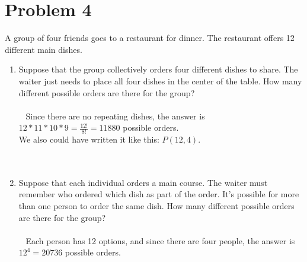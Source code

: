 \documentclass{amsart}
\theoremstyle{definition}
\theoremstyle{Exercise}
\theoremstyle{remark}
\theoremstyle{rule}
\numberwithin{equation}{section}
\begin{document}
\section*{Problem 4}
\item A group of four friends goes to a restaurant for dinner. The restaurant offers 12 different main dishes.\\
    \begin{enumerate}[label=(\roman*)]
    \item Suppose that the group collectively orders four different dishes to share. The waiter just needs to place all four dishes in the center of the table. How many different possible orders are there for the group?\\\\\
Since there are no repeating dishes, the answer is $12 * 11 * 10 * 9 = \frac{12!}{8!} = 11880$ possible orders.\\
We also could have written it like this: $P(12,4)$.
\\\\\
    \item Suppose that each individual orders a main course. The waiter must remember who ordered which dish as part of the order. It's possible for more than one person to order the same dish. How many different possible orders are there for the group?\\\\\
Each person has 12 options, and since there are four people, the answer is $12^4 = 20736$ possible orders.
\\\\\

    \end{enumerate}
\end{document}
